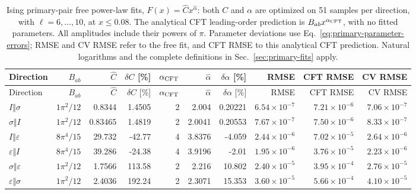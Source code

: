 \begin{longtable}{lrrrrrrrrr}
\caption{Ising primary-pair free power-law fits, $F(x)=\widehat Cx^{\widehat\alpha}$: both $C$ and $\alpha$ are optimized on 51 samples per direction, with $\ell=6,\ldots,10$, at $x\leq0.08$. The analytical CFT leading-order prediction is $B_{ab}x^{\alpha_{\rm CFT}}$, with no fitted parameters. All amplitudes include their powers of $\pi$. Parameter deviations use Eq.~\eqref{eq:primary-parameter-errors}; RMSE and CV RMSE refer to the free fit, and CFT RMSE to this analytical CFT prediction. Natural logarithms and the complete definitions in Sec.~\ref{sec:primary-fits} apply.}
\label{tab:ising-primary-all-fits}\\\toprule
Direction & $B_{ab}$ & $\widehat C$ & $\delta C$ [\%] & $\alpha_{\rm CFT}$ & $\widehat\alpha$ & $\delta\alpha$ [\%] & RMSE & CFT RMSE & CV RMSE\\\midrule\endfirsthead
\toprule
Direction & $B_{ab}$ & $\widehat C$ & $\delta C$ [\%] & $\alpha_{\rm CFT}$ & $\widehat\alpha$ & $\delta\alpha$ [\%] & RMSE & CFT RMSE & CV RMSE\\\midrule\endhead
\bottomrule\endfoot
$I\Vert \sigma$ & $1\pi^{2}/12$ & 0.8344 & 1.4505 & 2 & 2.004 & 0.20221 & $6.54\!\times\!10^{-7}$ & $7.21\!\times\!10^{-6}$ & $7.06\!\times\!10^{-7}$\\
$\sigma\Vert I$ & $1\pi^{2}/12$ & 0.83465 & 1.4819 & 2 & 2.0041 & 0.20553 & $7.67\!\times\!10^{-7}$ & $7.50\!\times\!10^{-6}$ & $8.33\!\times\!10^{-7}$\\
$I\Vert \varepsilon$ & $8\pi^{4}/15$ & 29.732 & -42.77 & 4 & 3.8376 & -4.059 & $2.44\!\times\!10^{-6}$ & $7.02\!\times\!10^{-5}$ & $2.64\!\times\!10^{-6}$\\
$\varepsilon\Vert I$ & $8\pi^{4}/15$ & 39.286 & -24.38 & 4 & 3.9196 & -2.01 & $1.95\!\times\!10^{-6}$ & $3.76\!\times\!10^{-5}$ & $2.23\!\times\!10^{-6}$\\
$\sigma\Vert \varepsilon$ & $1\pi^{2}/12$ & 1.7566 & 113.58 & 2 & 2.216 & 10.802 & $2.40\!\times\!10^{-5}$ & $3.95\!\times\!10^{-4}$ & $2.76\!\times\!10^{-5}$\\
$\varepsilon\Vert \sigma$ & $1\pi^{2}/12$ & 2.4036 & 192.24 & 2 & 2.3071 & 15.353 & $3.60\!\times\!10^{-5}$ & $5.66\!\times\!10^{-4}$ & $4.10\!\times\!10^{-5}$\\
\end{longtable}
